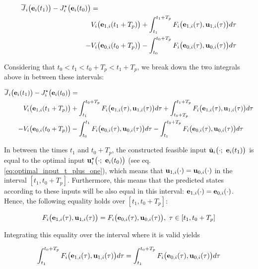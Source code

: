 \begin{align}
  \overline{J}_i\big(\bm{\mathbf{e}}_i(t_1)\big) - J_i^{\star}\big(\bm{\mathbf{e}}_i(t_0)\big) &= \\
   & V_i \big(\bm{\mathbf{e}}_{1,i} (t_1 + T_p)\big) + \int_{t_1}^{t_1 + T_p} F_i \big(\bm{\mathbf{e}}_{1,i}(\tau), \bm{\mathbf{u}}_{1,i} (\tau)\big) d \tau \\
  -&V_i \big(\bm{\mathbf{e}}_{0,i} (t_0 + T_p)\big) - \int_{t_0}^{t_0 + T_p} F_i \big(\bm{\mathbf{e}}_{0,i}(\tau), \bm{\mathbf{u}}_{0,i} (\tau)\big) d \tau
\end{align}

Considering that $t_0 < t_1 < t_0 + T_p < t_1 + T_p$, we break down the
two integrals above in between these intervals:

\begin{align}
  \overline{J}_i\big(\bm{\mathbf{e}}_i(t_1)\big) - J_i^{\star}\big(\bm{\mathbf{e}}_i(t_0)\big) &= \\
    V_i \big(\bm{\mathbf{e}}_{1,i} (t_1 + T_p)\big)
    &+ \int_{t_1}^{t_0 + T_p} F_i \big(\bm{\mathbf{e}}_{1,i}(\tau), \bm{\mathbf{u}}_{1,i} (\tau)\big) d \tau
    + \int_{t_0 + T_p}^{t_1 + T_p} F_i \big(\bm{\mathbf{e}}_{1,i}(\tau), \bm{\mathbf{u}}_{1,i} (\tau)\big) d \tau \\
    -V_i \big(\bm{\mathbf{e}}_{0,i} (t_0 + T_p)\big)
    &- \int_{t_0}^{t_1} F_i \big(\bm{\mathbf{e}}_{0,i}(\tau), \bm{\mathbf{u}}_{0,i} (\tau)\big) d \tau
    - \int_{t_1}^{t_0 + T_p} F_i \big(\bm{\mathbf{e}}_{0,i}(\tau), \bm{\mathbf{u}}_{0,i} (\tau)\big) d \tau
\label{eq:convergence_4_integrals}
\end{align}

\begin{gg_box}
In between the times $t_1$ and $t_0 + T_p$, the constructed feasible input
$\tilde{\vect{u}}_i\big(\cdot;\ \vect{e}_i(t_1)\big)$ is equal to the optimal
input $\vect{u}_i^{\star}\big(\cdot;\ \vect{e}_i(t_0)\big)$
(see eq. \ref{eq:optimal_input_t_plus_one}), which means that
$\bm{\mathbf{u}}_{1,i}(\cdot) = \bm{\mathbf{u}}_{0,i}(\cdot)$ in the interval $[t_1, t_0 + T_p]$.
Furthermore, this means that the predicted states according to these inputs will
be also equal in this interval: $\bm{\mathbf{e}}_{1,i}(\cdot) = \bm{\mathbf{e}}_{0,i}(\cdot)$.
Hence, the following equality holds over $[t_1, t_0 + T_p]$:

\begin{align}
  F_i \big(\bm{\mathbf{e}}_{1,i}(\tau), \bm{\mathbf{u}}_{1,i} (\tau)\big) =
  F_i \big(\bm{\mathbf{e}}_{0,i}(\tau), \bm{\mathbf{u}}_{0,i} (\tau)\big),\ \tau \in [t_1, t_0 + T_p]
\end{align}

Integrating this equality over the interval where it is valid yields

\begin{align}
  \int_{t_1}^{t_0 + T_p}F_i \big(\bm{\mathbf{e}}_{1,i}(\tau), \bm{\mathbf{u}}_{1,i} (\tau)\big) d\tau =
  \int_{t_1}^{t_0 + T_p}F_i \big(\bm{\mathbf{e}}_{0,i}(\tau), \bm{\mathbf{u}}_{0,i} (\tau)\big) d\tau
\end{align}

\end{gg_box}

